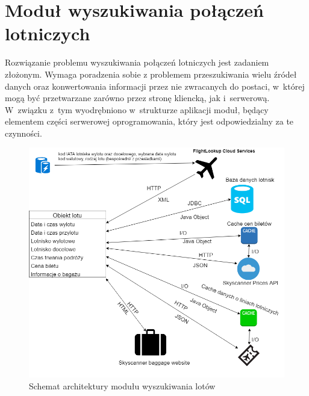 \documentclass[12pt, twoside]{report}
\begin{document}

\section{Moduł wyszukiwania połączeń lotniczych}
Rozwiązanie problemu wyszukiwania połączeń lotniczych jest zadaniem złożonym. Wymaga poradzenia sobie z problemem przeszukiwania wielu źródeł danych oraz konwertowania informacji przez nie zwracanych do postaci, w~której mogą być przetwarzane zarówno przez stronę kliencką, jak i~serwerową. W~związku z~tym wyodrębniono w~strukturze aplikacji moduł, będący elementem części serwerowej oprogramowania, który jest odpowiedzialny za te czynności.

\begin{figure}[!ht]
\centering
\includegraphics[scale=0.50, keepaspectratio]{search_module.png}
\caption{Schemat architektury modułu wyszukiwania lotów}
\label{fig:search_module}
\end{figure}
\end{document}
